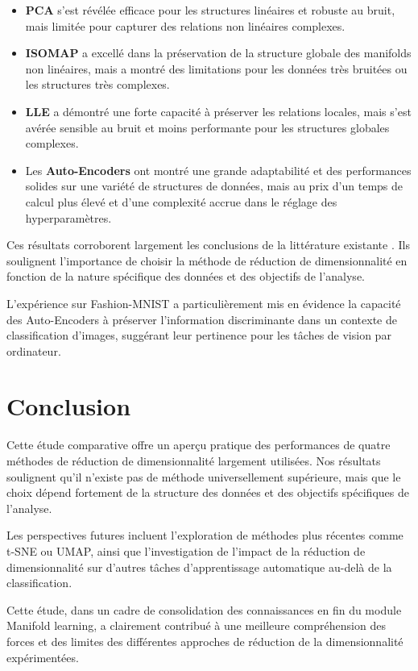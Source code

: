 \documentclass[unnumsec,webpdf,modern,large]{projet_manifold}%
\theoremstyle{thmstyleone}%
\theoremstyle{thmstyletwo}%
\theoremstyle{thmstylethree}%
\begin{document}
\begin{itemize}
    \item \textbf{PCA} s'est révélée efficace pour les structures linéaires et robuste au bruit, mais limitée pour capturer des relations non linéaires complexes.
    \item \textbf{ISOMAP} a excellé dans la préservation de la structure globale des manifolds non linéaires, mais a montré des limitations pour les données très bruitées ou les structures très complexes.
    \item \textbf{LLE} a démontré une forte capacité à préserver les relations locales, mais s'est avérée sensible au bruit et moins performante pour les structures globales complexes.
    \item Les \textbf{Auto-Encoders} ont montré une grande adaptabilité et des performances solides sur une variété de structures de données, mais au prix d'un temps de calcul plus élevé et d'une complexité accrue dans le réglage des hyperparamètres.
\end{itemize}

Ces résultats corroborent largement les conclusions de la littérature existante \cite{vandermaaten2009dimensionality, wang2021comprehensive}. Ils soulignent l'importance de choisir la méthode de réduction de dimensionnalité en fonction de la nature spécifique des données et des objectifs de l'analyse.

L'expérience sur Fashion-MNIST a particulièrement mis en évidence la capacité des Auto-Encoders à préserver l'information discriminante dans un contexte de classification d'images, suggérant leur pertinence pour les tâches de vision par ordinateur.

\section{Conclusion}
Cette étude comparative offre un aperçu pratique des performances de quatre méthodes de réduction de dimensionnalité largement utilisées. Nos résultats soulignent qu'il n'existe pas de méthode universellement supérieure, mais que le choix dépend fortement de la structure des données et des objectifs spécifiques de l'analyse.

Les perspectives futures incluent l'exploration de méthodes plus récentes comme t-SNE ou UMAP, ainsi que l'investigation de l'impact de la réduction de dimensionnalité sur d'autres tâches d'apprentissage automatique au-delà de la classification.

Cette étude, dans un cadre de consolidation des connaissances en fin du module Manifold learning, a clairement contribué à une meilleure compréhension des forces et des limites des différentes approches de réduction de la dimensionnalité expérimentées.
\end{document}

